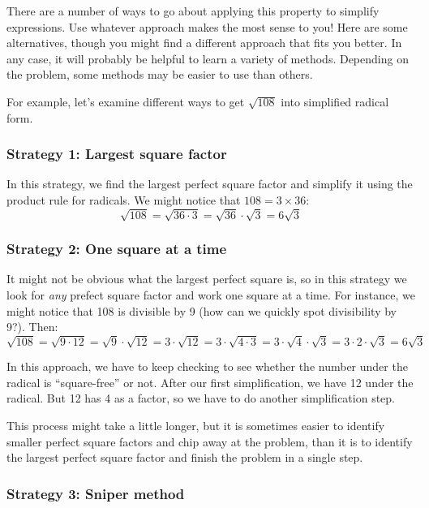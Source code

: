 There are a number of ways to go about applying this property to simplify expressions. Use whatever approach makes the most sense to you! Here are some alternatives, though you might find a different approach that fits you better. In any case, it will probably be helpful to learn a variety of methods. Depending on the problem, some methods may be easier to use than others.

For example, let's examine different ways to get $\sqrt{108}$ into simplified radical form.

\subsubsection{Strategy 1: Largest square factor}

In this strategy, we find the largest perfect square factor and simplify it using the product rule for radicals. We might notice that $108 = 3 \times 36$: \[\sqrt{108} = \sqrt{36 \cdot 3} = \sqrt{36} \cdot \sqrt{3} = 6\sqrt{3}\]

\subsubsection{Strategy 2: One square at a time}

It might not be obvious what the largest perfect square is, so in this strategy we look for \textit{any} prefect square factor and work one square at a time. For instance, we might notice that 108 is divisible by 9 (how can we quickly spot divisibility by 9?). Then: \[\sqrt{108} = \sqrt{9 \cdot 12} = \sqrt{9} \cdot \sqrt{12} = 3 \cdot \sqrt{12} = 3 \cdot \sqrt{4 \cdot 3} = 3 \cdot \sqrt{4} \cdot \sqrt{3} = 3 \cdot 2 \cdot \sqrt{3} = 6\sqrt{3}\]

In this approach, we have to keep checking to see whether the number under the radical is ``square-free'' or not. After our first simplification, we have 12 under the radical. But 12 has 4 as a factor, so we have to do another simplification step.

This process might take a little longer, but it is sometimes easier to identify smaller perfect square factors and chip away at the problem, than it is to identify the largest perfect square factor and finish the problem in a single step.

\subsubsection{Strategy 3: Sniper method}

